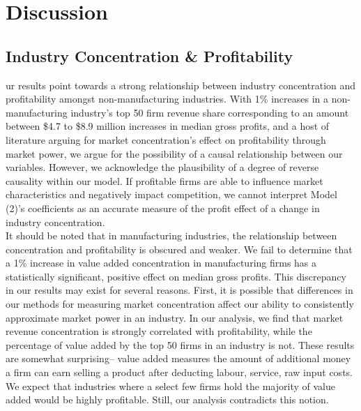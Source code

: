 %
%
\let\textcircled=\pgftextcircled
\chapter{Discussion}
\label{chap:4}

\section{Industry Concentration \& Profitability}

ur results point towards a strong relationship between industry concentration and profitability amongst non-manufacturing industries. With 1\% increases in a non-manufacturing industry’s top 50 firm revenue share corresponding to an amount between \$4.7 to \$8.9 million increases in median gross profits, and a host of literature arguing for market concentration's effect on profitability through market power, we argue for the possibility of a causal relationship between our variables. However, we acknowledge the plausibility of a degree of reverse causality within our model. If profitable firms are able to influence market characteristics and negatively impact competition, we cannot interpret Model (2)’s coefficients as an accurate measure of the profit effect of a change in industry concentration. \\

	It should be noted that in manufacturing industries, the relationship between concentration and profitability is obscured and weaker. We fail to determine that a 1\% increase in value added concentration in manufacturing firms has a statistically significant, positive effect on median gross profits. This discrepancy in our results may exist for several reasons. First, it is possible that differences in our methods for measuring market concentration affect our ability to consistently approximate market power in an industry. In our analysis, we find that market revenue concentration is strongly correlated with profitability, while the percentage of value added by the top 50 firms in an industry is not. These results are somewhat surprising-- value added measures the amount of additional money a firm can earn selling a product after deducting labour, service, raw input costs. We expect that industries where a select few firms hold the majority of value added would be highly profitable. Still, our analysis contradicts this notion. \\

